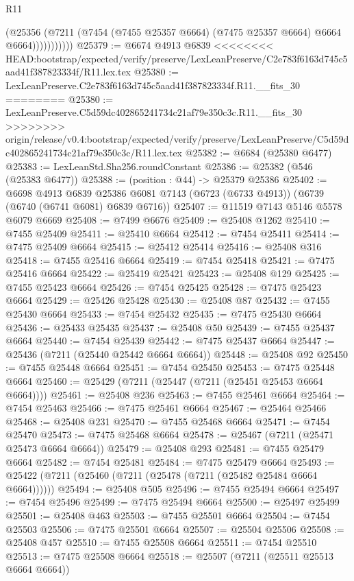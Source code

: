 \begin{lexlean}{R11}
\begin{coremodule}
{{{{{{{{{{{{{{{{{{{{{{{{{{{{{{{{{{{{{{{{{{{{{{{{{{{{{{{{{{{{{{{{{{{{{{{{{{{{{{{{{{                    (@25356
                      (@7211 (@7454 (@7455 @25357 @6664) (@7475 @25357 @6664) @6664 @6664)))))))))))
@25379 := @6674 @4913 @6839
<<<<<<<< HEAD:bootstrap/expected/verify/preserve/LexLeanPreserve/C2e783f6163d745c5aad41f387823334f/R11.lex.tex
@25380 := LexLeanPreserve.C2e783f6163d745c5aad41f387823334f.R11.__fits_30
========
@25380 := LexLeanPreserve.C5d59dc402865241734c21af79e350c3c.R11.__fits_30
>>>>>>>> origin/release/v0.4:bootstrap/expected/verify/preserve/LexLeanPreserve/C5d59dc402865241734c21af79e350c3c/R11.lex.tex
@25382 := @6684 (@25380 @6477)
@25383 := LexLeanStd.Sha256.roundConstant
@25386 := @25382 (@546 (@25383 @6477))
@25388 := (position : @44) -> @25379 @25386
@25402 := @6698
    @4913
    @6839
    @25386
    @6081
    @7143
    (@6723 (@6733 @4913))
    (@6739 (@6740 (@6741 @6081) @6839 @6716))
@25407 := @11519 @7143 @5146 @5578 @6079 @6669
@25408 := @7499 @6676
@25409 := @25408 @1262
@25410 := @7455 @25409
@25411 := @25410 @6664
@25412 := @7454 @25411
@25414 := @7475 @25409 @6664
@25415 := @25412 @25414
@25416 := @25408 @316
@25418 := @7455 @25416 @6664
@25419 := @7454 @25418
@25421 := @7475 @25416 @6664
@25422 := @25419 @25421
@25423 := @25408 @129
@25425 := @7455 @25423 @6664
@25426 := @7454 @25425
@25428 := @7475 @25423 @6664
@25429 := @25426 @25428
@25430 := @25408 @87
@25432 := @7455 @25430 @6664
@25433 := @7454 @25432
@25435 := @7475 @25430 @6664
@25436 := @25433 @25435
@25437 := @25408 @50
@25439 := @7455 @25437 @6664
@25440 := @7454 @25439
@25442 := @7475 @25437 @6664
@25447 := @25436 (@7211 (@25440 @25442 @6664 @6664))
@25448 := @25408 @92
@25450 := @7455 @25448 @6664
@25451 := @7454 @25450
@25453 := @7475 @25448 @6664
@25460 := @25429 (@7211 (@25447 (@7211 (@25451 @25453 @6664 @6664))))
@25461 := @25408 @236
@25463 := @7455 @25461 @6664
@25464 := @7454 @25463
@25466 := @7475 @25461 @6664
@25467 := @25464 @25466
@25468 := @25408 @231
@25470 := @7455 @25468 @6664
@25471 := @7454 @25470
@25473 := @7475 @25468 @6664
@25478 := @25467 (@7211 (@25471 @25473 @6664 @6664))
@25479 := @25408 @293
@25481 := @7455 @25479 @6664
@25482 := @7454 @25481
@25484 := @7475 @25479 @6664
@25493 := @25422 (@7211 (@25460 (@7211 (@25478 (@7211 (@25482 @25484 @6664 @6664))))))
@25494 := @25408 @505
@25496 := @7455 @25494 @6664
@25497 := @7454 @25496
@25499 := @7475 @25494 @6664
@25500 := @25497 @25499
@25501 := @25408 @463
@25503 := @7455 @25501 @6664
@25504 := @7454 @25503
@25506 := @7475 @25501 @6664
@25507 := @25504 @25506
@25508 := @25408 @457
@25510 := @7455 @25508 @6664
@25511 := @7454 @25510
@25513 := @7475 @25508 @6664
@25518 := @25507 (@7211 (@25511 @25513 @6664 @6664))
}}}}}}}}}}}}}}}}}}}}}}}}}}}}}}}}}}}}}}}}}}}}}}}}}}}}}}}}}}}}}}}}}}}}}}}}}}}}}}}}}}
\end{coremodule}
\end{lexlean}
